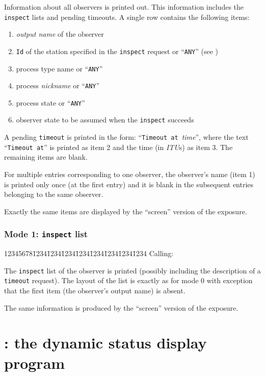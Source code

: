 Information about all observers is printed out.
This information includes the {\tt inspect} lists and pending timeouts.
A single row contains the following items:

\begin{enumerate}
\item
{\em output name\/} of the observer
\item
{\tt Id} of the station specified in the {\tt inspect} request or
``{\tt ANY}'' (see )
\item
process type name or ``{\tt ANY}''
\item
process {\em nickname\/} or ``{\tt ANY}''
\item
process state or ``{\tt ANY}''
\item
observer state to be assumed when the {\tt inspect} succeeds
\end{enumerate}

A pending {\tt timeout} is printed in the form: ``{\tt Timeout~at}~{\em time}'',
where the text ``{\tt Timeout at}'' is printed as item 2 and the
time (in {\em ITU\/}s) as item 3.
The remaining items are blank.

For multiple entries corresponding to one observer,
the observer's name (item 1) is printed only once (at the first entry)
and it is blank in the subsequent entries belonging to the same observer.

Exactly the same items are displayed by the ``screen'' version of the
exposure.

\subsubsection*{Mode 1: {\tt inspect} list}

{\tt\begin{tabbing}
12345678\=1234\=1234\=1234\=1234\=1234\=1234\=1234\=1234\kill
{\rm Calling:}
\end{tabbing}}

The {\tt inspect} list of the observer is printed (possibly including the
description of a {\tt timeout} request).
The layout of the list is exactly as for mode 0 with exception that the
first item (the observer's output name) is absent.

The same information is produced by the ``screen'' version of the exposure.

\section{\dsd: the dynamic status display program}
\label{rm_ds}

